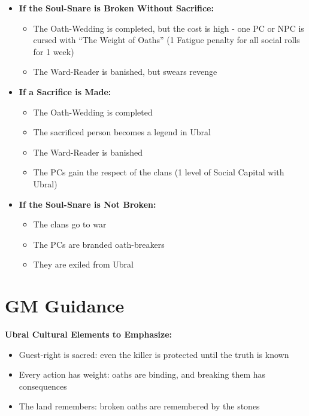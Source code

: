 \documentclass[11pt]{article}
\begin{document}
\begin{itemize}
    \item \textbf{If the Soul-Snare is Broken Without Sacrifice:}
    \begin{itemize}
        \item The Oath-Wedding is completed, but the cost is high - one PC or NPC is cursed with ``The Weight of Oaths'' (1 Fatigue penalty for all social rolls for 1 week)
        \item The Ward-Reader is banished, but swears revenge
    \end{itemize}
    
    \item \textbf{If a Sacrifice is Made:}
    \begin{itemize}
        \item The Oath-Wedding is completed
        \item The sacrificed person becomes a legend in Ubral
        \item The Ward-Reader is banished
        \item The PCs gain the respect of the clans (1 level of Social Capital with Ubral)
    \end{itemize}
    
    \item \textbf{If the Soul-Snare is Not Broken:}
    \begin{itemize}
        \item The clans go to war
        \item The PCs are branded oath-breakers
        \item They are exiled from Ubral
    \end{itemize}
\end{itemize}

\section*{GM Guidance}

\textbf{Ubral Cultural Elements to Emphasize:}
\begin{itemize}
    \item Guest-right is sacred: even the killer is protected until the truth is known
    \item Every action has weight: oaths are binding, and breaking them has consequences
    \item The land remembers: broken oaths are remembered by the stones
\end{itemize}
\end{document}

